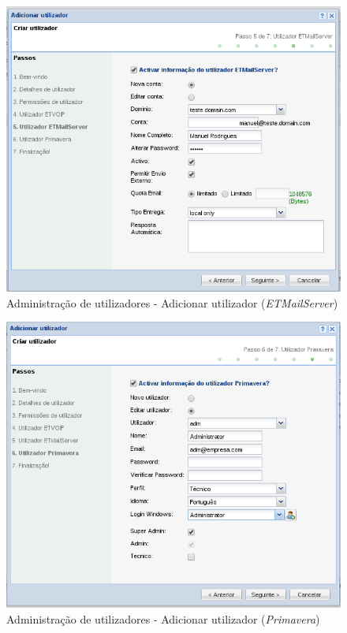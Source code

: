 {\begin{figure}[H]
        \begin{center}
        \includegraphics[scale=0.4]{screenshots/users/etva/create_user_wiz_05.png}
        \caption{Administração de utilizadores - Adicionar utilizador (\textit{ETMailServer})}
        \label{fig:create_user_wiz_05}
        \end{center}
\end{figure}

\begin{figure}[H]
        \begin{center}
        \includegraphics[scale=0.4]{screenshots/users/etva/create_user_wiz_06.png}
        \caption{Administração de utilizadores - Adicionar utilizador (\textit{Primavera})}
        \label{fig:create_user_wiz_06}
        \end{center}
\end{figure}

}
